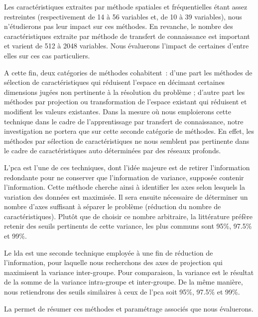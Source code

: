 Les caractéristiques extraites par méthode spatiales et fréquentielles étant assez restreintes (respectivement de 14 à 56 variables et, de 10 à 39 variables), nous n'étudierons pas leur impact sur ces méthodes. En revanche, le nombre des caractéristiques extraite par méthode de transfert de connaissance est important et varient de 512 à 2048 variables. Nous évaluerons l'impact de certaines d'entre elles sur ces cas particuliers.\par

A cette fin, deux catégories de méthodes cohabitent~: d'une part les méthodes de sélection de caractéristiques qui réduisent l'espace en décimant certaines dimensions jugées non pertinente à la résolution du problème ; d'autre part les méthodes par projection ou transformation de l'espace existant qui réduisent et modifient les valeurs existantes. Dans la mesure où nous emploierons cette technique dans le cadre de l'apprentissage par transfert de connaissance, notre investigation ne portera que sur cette seconde catégorie de méthodes. En effet, les méthodes par sélection de caractéristiques ne nous semblent pas pertinente dans le cadre de caractéristiques auto déterminées par des réseaux profonds.\par

L'\gls{pca} est l'une de ces techniques, dont l'idée majeure est de retirer l'information redondante pour ne conserver que l'information de variance, supposée contenir l'information. Cette méthode cherche ainsi à identifier les axes selon lesquels la variation des données est maximisée. Il sera ensuite nécessaire de déterminer un nombre d'axes suffisant à séparer le problème (réduction du nombre de caractéristiques). Plutôt que de choisir ce nombre arbitraire, la littérature préfère retenir des seuils pertinents de cette variance, les plus communs sont 95\%, 97.5\% et 99\%.\par

Le \gls{lda} est une seconde technique employée à une fin de réduction de l'information, pour laquelle nous recherchons des axes de projection qui maximisent la variance inter-groupe. Pour comparaison, la variance est le résultat de la somme de la variance intra-groupe et inter-groupe. De la même manière, nous retiendrons des seuils similaires à ceux de l'\gls{pca} soit 95\%, 97.5\% et 99\%.\par

La  permet de résumer ces méthodes et paramétrage associés que nous évaluerons.\par 

